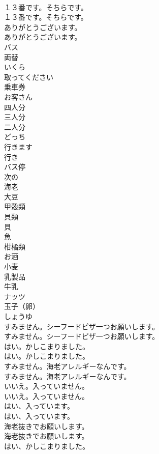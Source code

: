 \documentclass[8pt]{extreport}
\begin{document}
\begin{CJK}{UTF8}{min}
\\	１３番です。そちらです。	
\\	１３番です。そちらです。 
\\	ありがとうございます。	
\\	ありがとうございます。 
\\	バス
\\	両替
\\	いくら
\\	取ってください
\\	乗車券
\\	お客さん
\\	四人分
\\	三人分
\\	二人分
\\	どっち
\\	行きます
\\	行き
\\	バス停
\\	次の
\\	海老
\\	大豆
\\	甲殻類
\\	貝類
\\	貝
\\	魚
\\	柑橘類
\\	お酒
\\	小麦
\\	乳製品
\\	牛乳
\\	ナッツ
\\	玉子（卵）
\\	しょうゆ
\\	すみません。シーフードピザ一つお願いします。	
\\	すみません。シーフードピザ一つお願いします。 
\\	はい。かしこまりました。	
\\	はい。かしこまりました。 
\\	すみません。海老アレルギーなんです。	
\\	すみません。海老アレルギーなんです。 
\\	いいえ。入っていません。	
\\	いいえ。入っていません。 
\\	はい、入っています。	
\\	はい、入っています。 
\\	海老抜きでお願いします。	
\\	海老抜きでお願いします。 
\\	はい、かしこまりました。	

\end{CJK}
\end{document}
